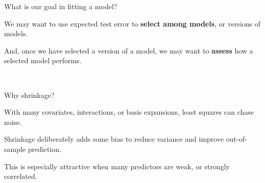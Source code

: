 \documentclass[xcolor={table}, handout]{beamer}
\begin{document}



\begin{frame}{What is our goal in fitting a model?}

\begin{wideitemize}
\item We may want to use expected test error to \textbf{select among models}, or versions of models.\pause
\item And, once we have selected a version of a model, we may want to \textbf{assess} how a selected model performs. 
\end{wideitemize}

\end{frame}



\begin{transitionframe}
\centering

\LARGE \textcolor{white}{Shrinkage.}

\end{transitionframe}
\begin{frame}{Why shrinkage?}

\begin{wideitemize}
\item With many covariates, interactions, or basis expansions, least squares can chase noise. \pause
\item Shrinkage deliberately adds some bias to reduce variance and improve out-of-sample prediction. \pause
\item This is especially attractive when many predictors are weak, or strongly correlated.
\end{wideitemize}

\end{frame}
\end{document}
